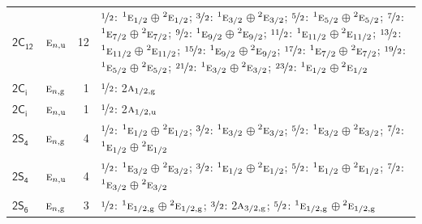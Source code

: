 \documentclass[10pt,a4paper]{article}
\numberwithin{equation}{section}
\newcommand{\grp}[1]{\mathsf{#1}}
\newcommand{\irr}[1]{\text{\normalfont\scshape #1}}
\newcommand{\conjpair}[1]{{}^{#1}}
\newcommand{\ptag}[1]{\mathrm{#1}}
\newlength{\fillwidth}\newlength{\cellwidth}\newlength{\colwidth}
\begin{document}
{\begin{longtable}{@{}llr>{\RaggedRight\arraybackslash}p{\fillwidth}@{}}
\href{2C12.pdf}{$\grp{2C_{12}}$} & $\irr{e}_{n,\ptag{u}}$ & 12 & $\nicefrac{1}{2}$: $\conjpair{1}\irr{e}_{1/2}$${}\oplus{}$$\conjpair{2}\irr{e}_{1/2}$; $\nicefrac{3}{2}$: $\conjpair{1}\irr{e}_{3/2}$${}\oplus{}$$\conjpair{2}\irr{e}_{3/2}$; $\nicefrac{5}{2}$: $\conjpair{1}\irr{e}_{5/2}$${}\oplus{}$$\conjpair{2}\irr{e}_{5/2}$; $\nicefrac{7}{2}$: $\conjpair{1}\irr{e}_{7/2}$${}\oplus{}$$\conjpair{2}\irr{e}_{7/2}$; $\nicefrac{9}{2}$: $\conjpair{1}\irr{e}_{9/2}$${}\oplus{}$$\conjpair{2}\irr{e}_{9/2}$; $\nicefrac{11}{2}$: $\conjpair{1}\irr{e}_{11/2}$${}\oplus{}$$\conjpair{2}\irr{e}_{11/2}$; $\nicefrac{13}{2}$: $\conjpair{1}\irr{e}_{11/2}$${}\oplus{}$$\conjpair{2}\irr{e}_{11/2}$; $\nicefrac{15}{2}$: $\conjpair{1}\irr{e}_{9/2}$${}\oplus{}$$\conjpair{2}\irr{e}_{9/2}$; $\nicefrac{17}{2}$: $\conjpair{1}\irr{e}_{7/2}$${}\oplus{}$$\conjpair{2}\irr{e}_{7/2}$; $\nicefrac{19}{2}$: $\conjpair{1}\irr{e}_{5/2}$${}\oplus{}$$\conjpair{2}\irr{e}_{5/2}$; $\nicefrac{21}{2}$: $\conjpair{1}\irr{e}_{3/2}$${}\oplus{}$$\conjpair{2}\irr{e}_{3/2}$; $\nicefrac{23}{2}$: $\conjpair{1}\irr{e}_{1/2}$${}\oplus{}$$\conjpair{2}\irr{e}_{1/2}$\\
\href{2S2.pdf}{$\grp{2C_{i}}$} & $\irr{e}_{n,\ptag{g}}$ & 1 & $\nicefrac{1}{2}$: 2$\irr{a}_{1/2,\ptag{g}}$\\
\href{2S2.pdf}{$\grp{2C_{i}}$} & $\irr{e}_{n,\ptag{u}}$ & 1 & $\nicefrac{1}{2}$: 2$\irr{a}_{1/2,\ptag{u}}$\\
\href{2S4.pdf}{$\grp{2S_{4}}$} & $\irr{e}_{n,\ptag{g}}$ & 4 & $\nicefrac{1}{2}$: $\conjpair{1}\irr{e}_{1/2}$${}\oplus{}$$\conjpair{2}\irr{e}_{1/2}$; $\nicefrac{3}{2}$: $\conjpair{1}\irr{e}_{3/2}$${}\oplus{}$$\conjpair{2}\irr{e}_{3/2}$; $\nicefrac{5}{2}$: $\conjpair{1}\irr{e}_{3/2}$${}\oplus{}$$\conjpair{2}\irr{e}_{3/2}$; $\nicefrac{7}{2}$: $\conjpair{1}\irr{e}_{1/2}$${}\oplus{}$$\conjpair{2}\irr{e}_{1/2}$\\
\href{2S4.pdf}{$\grp{2S_{4}}$} & $\irr{e}_{n,\ptag{u}}$ & 4 & $\nicefrac{1}{2}$: $\conjpair{1}\irr{e}_{3/2}$${}\oplus{}$$\conjpair{2}\irr{e}_{3/2}$; $\nicefrac{3}{2}$: $\conjpair{1}\irr{e}_{1/2}$${}\oplus{}$$\conjpair{2}\irr{e}_{1/2}$; $\nicefrac{5}{2}$: $\conjpair{1}\irr{e}_{1/2}$${}\oplus{}$$\conjpair{2}\irr{e}_{1/2}$; $\nicefrac{7}{2}$: $\conjpair{1}\irr{e}_{3/2}$${}\oplus{}$$\conjpair{2}\irr{e}_{3/2}$\\
\href{2S6.pdf}{$\grp{2S_{6}}$} & $\irr{e}_{n,\ptag{g}}$ & 3 & $\nicefrac{1}{2}$: $\conjpair{1}\irr{e}_{1/2,\ptag{g}}$${}\oplus{}$$\conjpair{2}\irr{e}_{1/2,\ptag{g}}$; $\nicefrac{3}{2}$: 2$\irr{a}_{3/2,\ptag{g}}$; $\nicefrac{5}{2}$: $\conjpair{1}\irr{e}_{1/2,\ptag{g}}$${}\oplus{}$$\conjpair{2}\irr{e}_{1/2,\ptag{g}}$\\

\end{longtable}}
\end{document}
